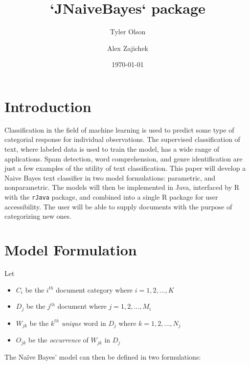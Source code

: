 \documentclass[a4paper]{article}
\begin{document}
\title{`JNaiveBayes` package}
\author{Tyler Olson \and Alex Zajichek}
\date{\today}
\maketitle
{}

\section{Introduction}
Classification in the field of machine learning is used to predict some type of categorial response for individual observations. The supervised classification of text, where labeled data is used to train the model, has a wide range of applications. Spam detection, word comprehension, and genre identification are just a few examples of the utility of text classification. This paper will develop a Naive Bayes text classifier in two model formulations: parametric, and nonparametric. The models will then be implemented in Java, interfaced by R with the {\tt rJava} package, and combined into a single R package for user accessibility. The user will be able to supply documents with the purpose of categorizing new ones.
\section{Model Formulation}
 
Let 
\begin{itemize}
\item $C_i$ be the $i^{th}$ document category where $i=1,2,...,K$  
\item $D_j$ be the $j^{th}$ document where $j =1,2,...,M_i$
\item $W_{jk}$ be the $k^{th}$ {\it unique} word in $D_j$ where $k=1,2,...,N_j$  
\item $O_{jk}$ be the {\it occurrence} of $W_{jk}$ in $D_j$ 
\end{itemize}
The Na\"{i}ve Bayes' model can then be defined in two formulations:
\end{document}
